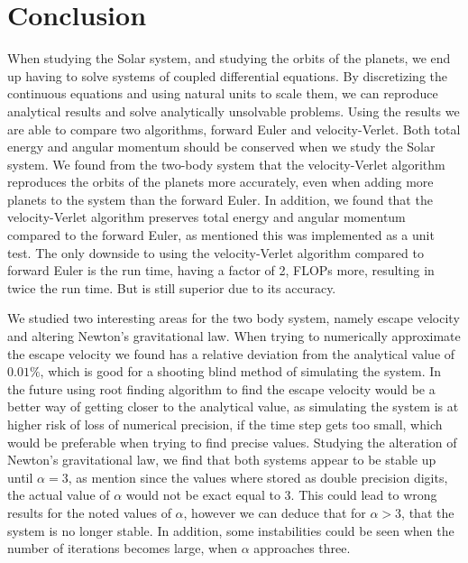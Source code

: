 \documentclass[%
reprint,
nofootinbib,
amsmath,amssymb,
aps,
]{revtex4-1}
\begin{document}
\section{Conclusion} %
When studying the Solar system, and studying the orbits of the planets, we end up having to solve systems of coupled differential equations. By discretizing the continuous equations and using natural units to scale them, we can reproduce analytical results and solve analytically unsolvable problems. Using the results we are able to compare two algorithms, forward Euler and velocity-Verlet. Both total energy and angular momentum should be conserved when we study the Solar system. We found from the two-body system that the velocity-Verlet algorithm reproduces the orbits of the planets more accurately, even when adding more planets to the system than the forward Euler. In addition, we found that the velocity-Verlet algorithm preserves total energy and angular momentum compared to the forward Euler, as mentioned this was implemented as a unit test. 
The only downside to using the velocity-Verlet algorithm compared to forward Euler is the run time, having a factor of 2, FLOPs more, resulting in twice the run time. But is still superior due to its accuracy. 

We studied two interesting areas for the two body system, namely escape velocity and altering Newton's gravitational law. 
When trying to numerically approximate the escape velocity we found has a relative deviation from the analytical value of $0.01\%$, which is good for a shooting blind method of simulating the system. In the future using root finding algorithm to find the escape velocity would be a better way of getting closer to the analytical value, as simulating the system is at higher risk of loss of numerical precision, if the time step gets too small, which would be preferable when trying to find precise values. 
Studying the alteration of Newton's gravitational law, we find that both systems appear to be stable up until $\alpha = 3$, as mention since the values where stored as double precision digits, the actual value of $\alpha$ would not be exact equal to 3. This could lead to wrong results for the noted values of $\alpha$, however we can deduce that for $\alpha > 3$, that the system is no longer stable. 
In addition, some instabilities could be seen when the number of iterations becomes large, when $\alpha$ approaches three. 
\end{document}

